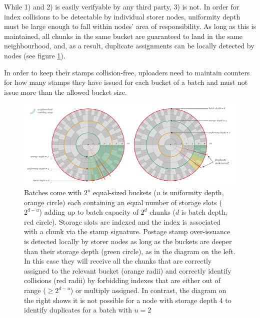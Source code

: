 While 1) and 2) is easily verifyable by any third party, 3) is not.
In order for index collisions to be detectable by individual storer nodes, uniformity depth must be large enough to fall within nodes' area of responsibility.
As long as this is maintained, all chunks in the same bucket are guaranteed to land in the same neighbourhood, and, as a result, duplicate assignments can be locally detected by nodes (see figure \ref{fig:over-issuance}).

In order to keep their stamps collision-free, uploaders need to maintain counters for how many stamps they have issued for each bucket of a batch and must not issue more than the allowed bucket size. 

\begin{figure}[!ht]
  \centering
    \includegraphics[width=1\textwidth]{fig/batch-structure.pdf}
  \caption[Batch structure, uniformity and over-issuance]{Batches come with $2^u$ equal-sized buckets ($u$ is uniformity depth, orange circle) each containing an equal number of storage slots ($2^{d-u}$) adding up to batch capacity of $2^d$ chunks ($d$ is batch depth, red circle). Storage slots are indexed and the index is associated with a chunk via the stamp signature. Postage stamp over-issuance is detected locally by storer nodes as long as the buckets are deeper than their storage depth (green circle), as in the diagram on the left. In this case they will receive all the chunks that are correctly assigned to the relevant bucket (orange radii) and correctly identify collisions (red radii) by forbidding indexes that are either out of range ($\geq 2^{d-u}$) or multiply assigned. In contrast, the diagram on the right shows it is not possible for a node with storage depth 4 to identify duplicates for a batch with $u=2$}
\label{fig:over-issuance}
\end{figure}    



